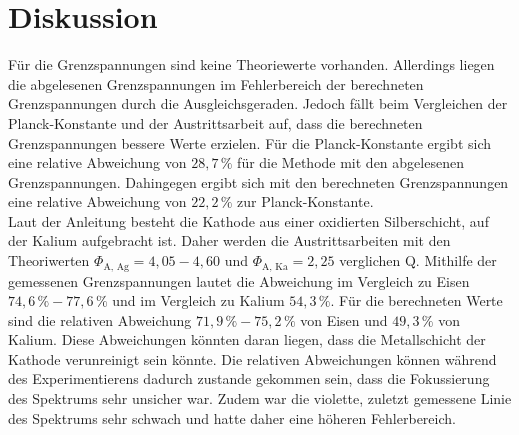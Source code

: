 \section{Diskussion}
\label{sec:Diskussion}
Für die Grenzspannungen sind keine Theoriewerte vorhanden. Allerdings liegen die abgelesenen Grenzspannungen
im Fehlerbereich der berechneten Grenzspannungen durch die Ausgleichsgeraden. Jedoch fällt beim Vergleichen der 
Planck-Konstante und der Austrittsarbeit auf, dass die berechneten Grenzspannungen bessere Werte erzielen.
Für die Planck-Konstante ergibt sich eine relative Abweichung von $28,7\,\%$ für die Methode mit den abgelesenen Grenzspannungen.
Dahingegen ergibt sich mit den berechneten Grenzspannungen eine relative Abweichung von $22,2\,\%$ zur Planck-Konstante. \\Laut der Anleitung \cite{anleitungV500}
besteht die Kathode aus einer oxidierten Silberschicht, auf der Kalium aufgebracht ist. Daher werden die Austrittsarbeiten mit den Theoriwerten
$\Phi_{\text{A, Ag}} = 4,05 - 4,60$ und $\Phi_{\text{A, Ka}} = 2,25$ verglichen Q\cite{Austrittsarbeit}. Mithilfe der gemessenen Grenzspannungen lautet die Abweichung
im Vergleich zu Eisen $74,6\,\% - 77,6\,\%$ und im Vergleich zu Kalium $54,3\,\%$. Für die berechneten Werte sind die relativen Abweichung
$71,9\,\% - 75,2\,\%$ von Eisen und $49,3\,\%$ von Kalium. Diese Abweichungen könnten daran liegen, dass die Metallschicht der Kathode
verunreinigt sein könnte. Die relativen Abweichungen können während des Experimentierens dadurch zustande gekommen sein, dass die Fokussierung
des Spektrums sehr unsicher war. Zudem war die violette, zuletzt gemessene Linie des Spektrums sehr schwach und hatte daher eine höheren Fehlerbereich. 
